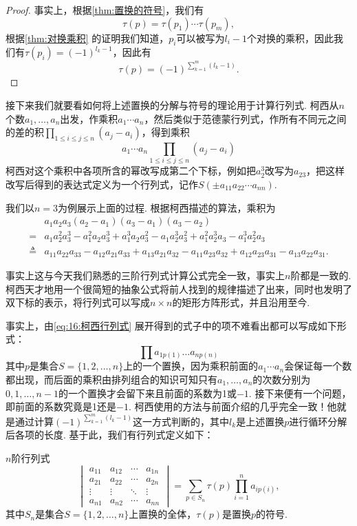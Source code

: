 \begin{proof}
    事实上，根据\autoref{thm:置换的符号}，我们有
    \[\tau(p)=\tau(p_1)\cdots\tau(p_m),\]
    根据\autoref{thm:对换乘积} 的证明我们知道，$p_i$可以被写为$l_i-1$个对换的乘积，因此我们有$\tau(p_i)=(-1)^{l_k-1}$，因此有
    \[\tau(p)=(-1)^{\sum\limits_{k=1}^m(l_k-1)}.\]
\end{proof}

接下来我们就要看如何将上述置换的分解与符号的理论用于计算行列式. 柯西从$n$个数$a_1,\ldots,a_n$出发，作乘积$a_1\cdots a_n$，然后类似于范德蒙行列式，作所有不同元之间的差的积$\displaystyle\prod_{1\leqslant i\leqslant j\leqslant n}(a_j-a_i)$，得到乘积
\begin{equation}\label{eq:16:柯西行列式}
    a_1\cdots a_n\prod_{1\leqslant i\leqslant j\leqslant n}(a_j-a_i)
\end{equation}
柯西对这个乘积中各项所含的幂改写成第二个下标，例如把$a_2^3$改写为$a_{23}$，把这样改写后得到的表达式定义为一个行列式，记作$S(\pm a_{11}a_{22}\cdots a_{nn})$.

我们以$n=3$为例展示上面的过程. 根据柯西描述的算法，乘积为
\begin{align*}
               & a_1a_2a_3(a_2-a_1)(a_3-a_1)(a_3-a_2)                                                                               \\
    =          & a_1a_2^2a_3^3-a_1^2a_2a_3^3+a_1^3a_2a_3^2-a_1a_2^3a_3^2+a_1^2a_2^3a_3-a_1^3a_2^2a_3                                \\
    \triangleq & a_{11}a_{22}a_{33}-a_{12}a_{21}a_{33}+a_{13}a_{21}a_{32}-a_{11}a_{23}a_{32}+a_{12}a_{23}a_{31}-a_{13}a_{22}a_{31}.
\end{align*}

事实上这与今天我们熟悉的三阶行列式计算公式完全一致，事实上$n$阶都是一致的. 柯西天才地用一个很简短的抽象公式将前人找到的规律描述了出来，同时也发明了双下标的表示，将行列式可以写成$n\times n$的矩形方阵形式，并且沿用至今.

事实上，由\autoref{eq:16:柯西行列式} 展开得到的式子中的项不难看出都可以写成如下形式：
\[\prod a_{1p(1)}\ldots a_{np(n)}\]
其中$p$是集合$S=\{1,2,\ldots,n\}$上的一个置换，因为乘积前面的$a_1\cdots a_n$会保证每一个数都出现，而后面的乘积由排列组合的知识可知只有$a_1,\ldots,a_n$的次数分别为$0,1,\ldots,n-1$的一个置换才会留下来且前面的系数为1或$-1$. 接下来便有一个问题，即前面的系数究竟是1还是$-1$. 柯西使用的方法与前面介绍的几乎完全一致！他就是通过计算$(-1)^{\sum\limits_{k=1}^m(l_k-1)}$这一方式判断的，其中$l_k$是上述置换$p$进行循环分解后各项的长度. 基于此，我们有行列式定义如下：
\begin{definition}{}{}
    $n$阶行列式
    \[\begin{vmatrix}
            a_{11} & a_{12} & \cdots & a_{1n} \\
            a_{21} & a_{22} & \cdots & a_{2n} \\
            \vdots & \vdots & \ddots & \vdots \\
            a_{n1} & a_{n2} & \cdots & a_{nn}
        \end{vmatrix}=\sum_{p\in S_n}\tau(p)\prod_{i=1}^na_{ip(i)},\]
    其中$S_n$是集合$S=\{1,2,\ldots,n\}$上置换的全体，$\tau(p)$是置换$p$的符号.
\end{definition}

